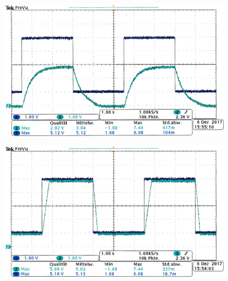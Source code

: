     \begin{center}
        \captionsetup{type=figure}
        \begin{adjustbox}{max width=\linewidth, keepaspectratio}
            \includegraphics[width=120mm]{jpg/Sinus-KP-klein-KD-gross}
        \end{adjustbox}
        \label{fig:Sinus-KP-klein-KD-gross}
    \end{center}
\endminipage
%
\par
%
\minipage{\linewidth}
    \begin{center}
        \captionsetup{type=figure}
        \begin{adjustbox}{max width=\linewidth, keepaspectratio}
            \includegraphics[width=120mm]{jpg/Sinus-KP-gross-KD-gross}
        \end{adjustbox}
        \label{fig:Sinus-KP-gross-KD-gross}
    \end{center}
\endminipage
%
\par
%
\minipage{\linewidth}
